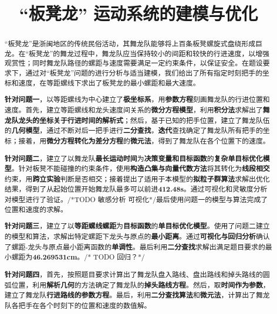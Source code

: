 \documentclass[a4paper]{article}
\title{“板凳龙” 运动系统的建模与优化}
\date{} %
\begin{document}
	\maketitle
	\vspace{-6em} %
	\begin{abstract}
		“板凳龙”是浙闽地区的传统民俗活动，其舞龙队能够将上百条板凳螺旋式盘绕形成巨龙。在“板凳龙”的舞龙过程中，舞龙队应当保持较小的间距和较快的行进速度，以增强观赏性；同时舞龙队路径的螺距与速度需要满足一定约束条件，以保证安全。在题设要求下，通过对“板凳龙”问题的进行分析与适当建模，我们给出了所有指定时刻把手的坐标和速度，在等距螺线下求出了板凳龙的最小螺距和最大速度。

		\hspace{0.2em}\textbf{针对问题一}，以等距螺线为中心建立了\textbf{极坐标系}，用\textbf{参数方程}刻画舞龙队的行进位置和速度。首先，建立等距螺线和龙头速度间关系的\textbf{微分方程模型}，利用\textbf{积分法}求解出了\textbf{舞龙队龙头的坐标关于行进时间的解析式}；然后，基于已知的把手位置，建立了舞龙队伍的\textbf{几何模型}，通过不断对后一把手进行\textbf{二分查找}，\textbf{迭代}查找确定了舞龙队所有把手的坐标；接着，用\textbf{微分方程转化为差分方程}的\textbf{微元法}，得到了舞龙队在各个位置下的速度。

		\textbf{针对问题二}，建立了以舞龙队\textbf{最长运动时间}为\textbf{决策变量和目标函数}的\textbf{复杂单目标优化模型}。针对板凳不能碰撞的约束条件，使用\textbf{构造凸集与向量代数方法}将其转化为\textbf{线段相交}约束，用\textbf{跨立实验}判断是否相交；接着提出了适用于本模型的\textbf{拟粒子群算法}求解出优化结果，得到了从起始位置开始舞龙队最多可以前进\textbf{412.48s}。通过可视化和灵敏度分析对模型进行了验证。/*TODO 敏感分析 可视化*/最后使用问题一的模型与算法完成了位置和速度的求解。

		\textbf{针对问题三}，建立了以\textbf{等距螺线螺距}为\textbf{目标函数}的\textbf{单目标优化模型}。使用了问题二建立的模型和算法，求解出特定螺距下龙头与原点的\textbf{最小距离}。通过\textbf{可视化与回归分析}确认了螺距-龙头与原点最小距离函数的\textbf{单调性}。最后利用\textbf{二分查找}求解出满足题目要求的最小螺距为\textbf{46.269531cm}。/* TODO 回归？*/

		\textbf{针对问题四}，首先，按照题目要求计算出了舞龙队盘入路线、盘出路线和掉头路线的圆弧位置，利用\textbf{解析几何}的方法确定了舞龙队的\textbf{掉头路线方程}。然后，取\textbf{时间作为参数}，建立了舞龙队\textbf{行进路线的参数方程}。最后，利用\textbf{二分查找算法}和\textbf{微元法}，计算出了舞龙队各把手在各个时刻下的位置和速度的数值解。


\end{abstract}
\end{document}
